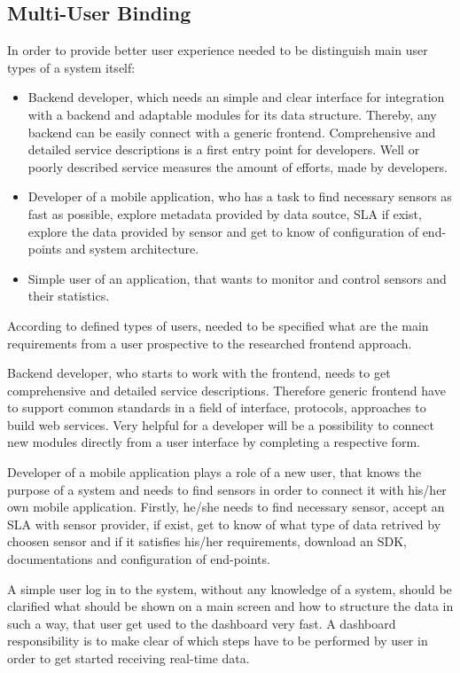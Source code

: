 \subsection {Multi-User Binding}
	In order to provide better user experience needed to be distinguish main user types of a system itself:
	\begin{itemize}
	\item Backend developer, which needs an simple and clear interface for integration with a backend and adaptable modules for its data structure. Thereby, any backend can be easily connect with a generic frontend. Comprehensive and detailed service descriptions is a first entry point for developers. Well or poorly described service measures the amount of efforts, made by developers. 
	\item Developer of a mobile application, who has a task to find necessary sensors as fast as possible, explore metadata provided by data soutce, SLA if exist, explore the data provided by sensor and get to know of configuration of end-points and system architecture.
	\item Simple user of an application, that wants to monitor and control sensors and their statistics.
	\end{itemize}
	According to defined types of users, needed to be specified what are the main requirements from a user prospective to the researched frontend approach.

	Backend developer, who starts to work with the frontend, needs to get comprehensive and detailed service descriptions. Therefore generic frontend have to support common standards in a field of interface, protocols, approaches to build web services. Very helpful for a developer will be a possibility to connect new modules directly from a user interface by completing a respective form.

	Developer of a mobile application plays a role of a new user, that knows the purpose of a system and needs to find sensors in order to connect it with his/her own mobile application. Firstly, he/she needs to find necessary sensor, accept an SLA with sensor provider, if exist, get to know of what type of data retrived by choosen sensor and if it satisfies his/her requirements, download an SDK, documentations and configuration of end-points.

	A simple user log in to the system, without any knowledge of a system, should be clarified what should be shown on a main screen and how to structure the data in such a way, that user get used to the dashboard very fast. A dashboard responsibility is to make clear of which steps have to be performed by user in order to get started receiving real-time data.

